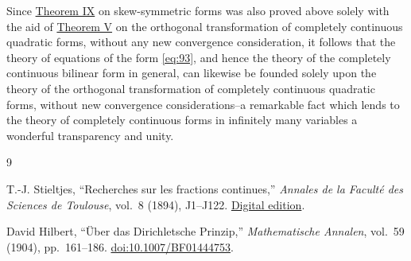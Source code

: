 \documentclass[b5paper,twoside]{article}
\begin{document}
Since \hyperref[thm:IX]{Theorem IX} on skew-symmetric forms was also proved
above solely with the aid of \hyperref[thm:V]{Theorem V} on the orthogonal
transformation of completely continuous quadratic forms, without any new
convergence consideration, it follows that the theory of equations of the
form \eqref{eq:93}, and hence the theory of the completely continuous
bilinear form in general, can likewise be founded solely upon the theory of
the orthogonal transformation of completely continuous quadratic forms,
without new convergence considerations--a remarkable fact which lends to
the theory of completely continuous forms in infinitely many variables a
wonderful transparency and unity.


{}
\begin{thebibliography}{9}

\label{bib:Stieltjes1894}
T.-J. Stieltjes,
``Recherches sur les fractions continues,''
\emph{Annales de la Facult\'e des Sciences de Toulouse}, vol.~8 (1894),
J1--J122.
\href{https://www.numdam.org/item/AFST_1894_1_8_4_J1_0/}{Digital edition}.

\label{bib:Hilbert1904Dirichlet}
David Hilbert,
``\"Uber das Dirichletsche Prinzip,''
\emph{Mathematische Annalen}, vol.~59 (1904), pp.~161--186.
\href{https://doi.org/10.1007/BF01444753}{doi:10.1007/BF01444753}.

\end{thebibliography}
\end{document}

